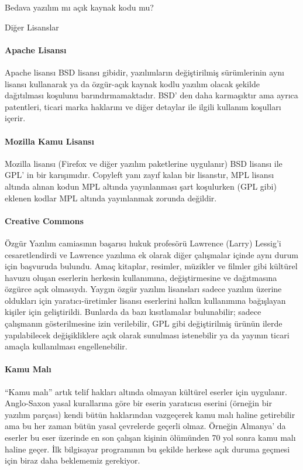 \documentclass[10pt,a5paper]{book}
\begin{document}
\begin{section}{Bedava yazılım mı açık kaynak kodu mu?}
\begin{subsection}{Diğer Lisanslar}
\paragraph{Apache Lisansı}{Apache lisansı BSD lisansı gibidir, yazılımların değiştirilmiş sürümlerinin aynı lisansı kullanarak ya da özgür-açık kaynak kodlu yazılım olacak şekilde dağıtılması koşulunu barındırmamaktadır. BSD' den daha karmaşıktır ama ayrıca patentleri, ticari marka haklarını ve diğer detaylar ile ilgili kullanım koşulları içerir.}
\paragraph{Mozilla Kamu Lisansı}{Mozilla lisansı (Firefox ve diğer yazılım paketlerine uygulanır) BSD lisansı ile GPL' in bir karışımıdır. Copyleft yanı zayıf kalan bir lisanstır, MPL lisansı altında alınan kodun MPL altında yayınlanması şart koşulurken (GPL gibi) eklenen kodlar MPL altında yayınlanmak zorunda değildir.}
\paragraph{Creative Commons}{Özgür Yazılım camiasının başarısı hukuk profesörü Lawrence (Larry) Lessig'i cesaretlendirdi ve Lawrence yazılıma ek olarak diğer çalışmalar içinde aynı durum için başvuruda bulundu. Amaç kitaplar, resimler, müzikler ve filmler gibi kültürel havuzu oluşan eserlerin herkesin kullanımına, değiştirmesine ve dağıtmasına özgürce açık olmasıydı. Yaygın özgür yazılım lisansları sadece yazılım üzerine oldukları için yaratıcı-üretimler lisansı eserlerini halkın kullanımına bağışlayan kişiler için geliştirildi. Bunlarda da bazı kısıtlamalar bulunabilir; sadece çalışmanın gösterilmesine izin verilebilir, GPL gibi değiştirilmiş ürünün ilerde yapılabilecek değişikliklere açık olarak sunulması istenebilir ya da yayının ticari amaçla kullanılması engellenebilir.}
\paragraph{Kamu Malı}{“Kamu malı” artık telif hakları altında olmayan kültürel eserler için uygulanır. Anglo-Saxon yasal kurallarına göre bir eserin yaratıcısı eserini (örneğin bir yazılım parçası) kendi bütün haklarından vazgeçerek kamu malı haline getirebilir ama bu her zaman bütün yasal çevrelerde geçerli olmaz. Örneğin Almanya' da eserler bu eser üzerinde en son çalışan kişinin ölümünden 70 yol sonra kamu malı haline geçer. İlk bilgisayar programının bu şekilde herkese açık duruma geçmesi için biraz daha beklememiz gerekiyor.}

\end{subsection}
\end{section}
\end{document}
